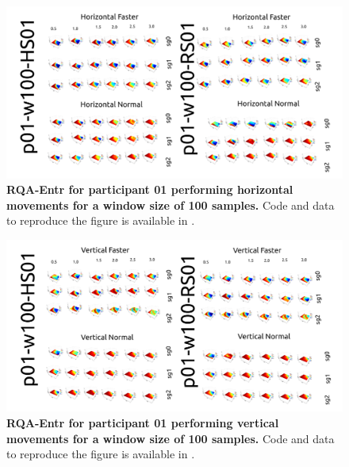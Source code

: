 \documentclass[12pt]{article}
\begin{document}
\newpage
\begin{figure}[ht!]
\centering
\includegraphics[scale=1.0]{figures/rqa/output/epsilons/rqa-epsilonsp01w100Horizontal}
    	\caption{
	{\bf RQA-Entr for participant 01 performing horizontal movements for a window size of 100 samples.}
	Code and data to reproduce the figure is available in \cite{srep2020}.
        }
    \label{fig-p01-H-w100}
\end{figure}
\begin{figure}[hb!]
\centering
\includegraphics[scale=1.0]{figures/rqa/output/epsilons/rqa-epsilonsp01w100Vertical}
    	\caption{
	{\bf RQA-Entr for participant 01 performing vertical movements for a window size of 100 samples.}
	Code and data to reproduce the figure is available in \cite{srep2020}.
        }
    \label{fig-p01-V-w100}
\end{figure}
\end{document}
